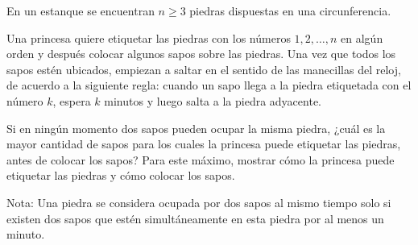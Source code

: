 En un estanque se encuentran $n \geq 3$ piedras dispuestas en una circunferencia.

Una princesa quiere etiquetar las piedras con los números $1,2, \ldots, n$ en algún orden y después colocar algunos sapos sobre las piedras. Una vez que todos los sapos estén ubicados, empiezan a saltar en el sentido de las manecillas del reloj, de acuerdo a la siguiente regla: cuando un sapo llega a la piedra etiquetada con el número $k$, espera $k$ minutos y luego salta a la piedra adyacente.

Si en ningún momento dos sapos pueden ocupar la misma piedra, ¿cuál es la mayor cantidad de sapos para los cuales la princesa puede etiquetar las piedras, antes de colocar los sapos? Para este máximo, mostrar cómo la princesa puede etiquetar las piedras y cómo colocar los sapos.\newline

Nota: Una piedra se considera ocupada por dos sapos al mismo tiempo solo si existen dos sapos que estén simultáneamente en esta piedra por al menos un minuto.